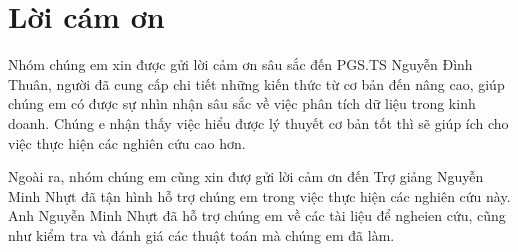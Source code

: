 \section*{Lời cám ơn}
Nhóm chúng em xin được gửi lời cảm ơn sâu sắc đến PGS.TS Nguyễn Đình Thuân, người đã cung cấp chi tiết những kiến thức từ cơ bản đến nâng cao, giúp chúng em có được sự nhìn nhận sâu sắc về việc phân tích dữ liệu trong kinh doanh. Chúng e nhận thấy việc hiểu được lý thuyết cơ bản tốt thì sẽ giúp ích cho việc thực hiện các nghiên cứu cao hơn.

Ngoài ra, nhóm chúng em cũng xin đượ gửi lời cảm ơn đến Trợ giảng Nguyễn Minh Nhựt đã tận hình hỗ trợ chúng em trong việc thực hiện các nghiên cứu này. Anh Nguyễn Minh Nhựt đã hỗ trợ chúng em về các tài liệu để ngheien cứu, cũng như kiểm tra và đánh giá các thuật toán mà chúng em đã làm.
